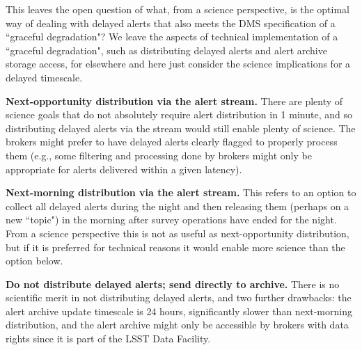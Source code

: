 \documentclass[DM,lsstdraft,authoryear,toc]{lsstdoc}
\begin{document}
This leaves the open question of what, from a science perspective, is the optimal way of dealing with delayed alerts that also meets the DMS specification of a ``graceful degradation"?
We leave the aspects of technical implementation of a ``graceful degradation", such as distributing delayed alerts and alert archive storage access, for elsewhere and here just consider the science implications for a delayed timescale.

{\bf Next-opportunity distribution via the alert stream.} There are plenty of science goals that do not absolutely require alert distribution in 1 minute, and so distributing delayed alerts via the stream would still enable plenty of science.
The brokers might prefer to have delayed alerts clearly flagged to properly process them (e.g., some filtering and processing done by brokers might only be appropriate for alerts delivered within a given latency).

{\bf Next-morning distribution via the alert stream.} This refers to an option to collect all delayed alerts during the night and then releasing them (perhaps on a new ``topic") in the morning after survey operations have ended for the night.
From a science perspective this is not as useful as next-opportunity distribution, but if it is preferred for technical reasons it would enable more science than the option below.

{\bf Do not distribute delayed alerts; send directly to archive.} There is no scientific merit in not distributing delayed alerts, and two further drawbacks: the alert archive update timescale is 24 hours, significantly slower than next-morning distribution, and the alert archive might only be accessible by brokers with data rights since it is part of the LSST Data Facility.



\clearpage

\end{document}
